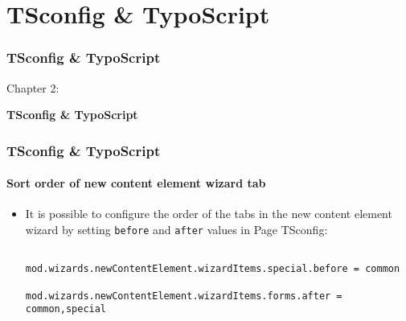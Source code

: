 %

\section{TSconfig \& TypoScript}
\begin{frame}[fragile]
	\frametitle{TSconfig \& TypoScript}

	\begin{center}\huge{Chapter 2:}\end{center}
	\begin{center}\huge{\color{typo3darkgrey}\textbf{TSconfig \& TypoScript}}\end{center}

\end{frame}

\begin{frame}[fragile]
	\frametitle{TSconfig \& TypoScript}
	\framesubtitle{Sort order of new content element wizard tab}

	\lstset{basicstyle=\tiny\ttfamily}

	\begin{itemize}
		\item It is possible to configure the order of the tabs in the new content element
			wizard by setting \texttt{before} and \texttt{after} values in Page TSconfig:

			\begin{lstlisting}
				mod.wizards.newContentElement.wizardItems.special.before = common
				mod.wizards.newContentElement.wizardItems.forms.after = common,special
			\end{lstlisting}

	\end{itemize}

\end{frame}

